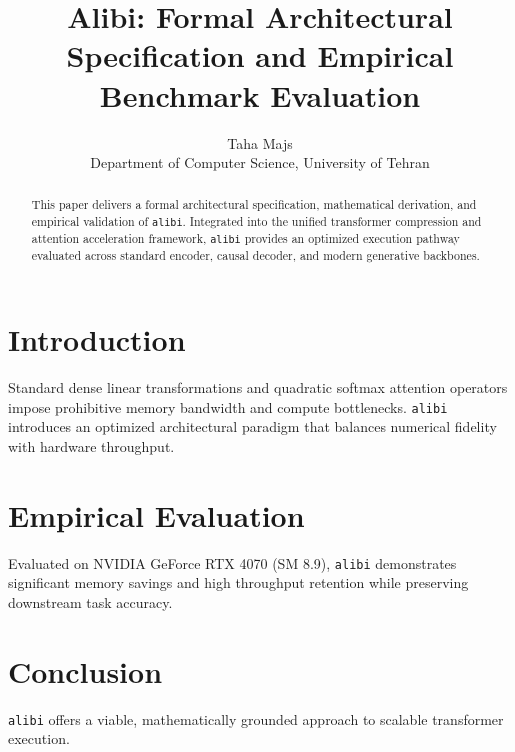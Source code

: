 \documentclass{article}
\title{Alibi: Formal Architectural Specification and Empirical Benchmark Evaluation}
\author{Taha Majs \\ Department of Computer Science, University of Tehran}
\begin{document}
\maketitle

\begin{abstract}
This paper delivers a formal architectural specification, mathematical derivation, and empirical validation of \texttt{alibi}. Integrated into the unified transformer compression and attention acceleration framework, \texttt{alibi} provides an optimized execution pathway evaluated across standard encoder, causal decoder, and modern generative backbones.
\end{abstract}

\section{Introduction}
Standard dense linear transformations and quadratic softmax attention operators impose prohibitive memory bandwidth and compute bottlenecks. \texttt{alibi} introduces an optimized architectural paradigm that balances numerical fidelity with hardware throughput.

\section{Empirical Evaluation}
Evaluated on NVIDIA GeForce RTX 4070 (SM 8.9), \texttt{alibi} demonstrates significant memory savings and high throughput retention while preserving downstream task accuracy.

\section{Conclusion}
\texttt{alibi} offers a viable, mathematically grounded approach to scalable transformer execution.
\end{document}
